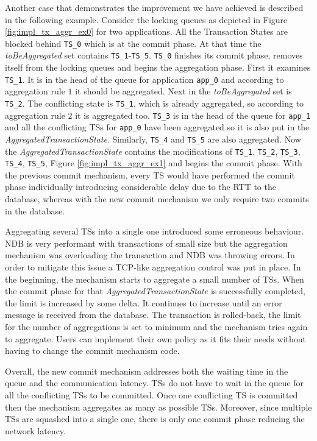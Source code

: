 Another case that demonstrates the improvement we have achieved is
described in the following example. Consider the locking queues as
depicted in Figure \ref{fig:impl_tx_aggr_ex0} for two applications. All the Transaction
States are blocked behind \texttt{TS\_0} which is at the commit
phase. At that time the \emph{toBeAggregated} set contains
\texttt{TS\_1}-\texttt{TS\_5}. \texttt{TS\_0} finishes its commit phase, removes
itself from the locking queues and begins the aggregation phase. First
it examines \texttt{TS\_1}. It is in the head of the queue for
application \texttt{app\_0} and according to aggregation rule $1$ it
should be aggregated. Next in the \emph{toBeAggregated} set is
\texttt{TS\_2}. The conflicting state is \texttt{TS\_1}, which is
already aggregated, so according to aggregation rule $2$ it is
aggregated too. \texttt{TS\_3} is in the head of the queue for
\texttt{app\_1} and all the conflicting TSs for \texttt{app\_0} have
been aggregated so it is also put in the
\emph{AggregatedTransactionState}. Similarly, \texttt{TS\_4} and
\texttt{TS\_5} are also aggregated. Now the
\emph{AggregatedTransactionState} contains the modifications of
\texttt{TS\_1}, \texttt{TS\_2}, \texttt{TS\_3}, \texttt{TS\_4},
\texttt{TS\_5}, Figure \ref{fig:impl_tx_aggr_ex1} and begins the commit phase. With the previous commit
mechanism, every TS would have performed the commit phase individually introducing
considerable delay due to the RTT to the database, whereas with the
new commit mechanism we only require two commits in the database.

Aggregating several TSs into a single one introduced some erroneous
behaviour. NDB is very performant with transactions of small size but
the aggregation mechanism was overloading the transaction and NDB was
throwing errors. In order to mitigate this issue a TCP-like aggregation control
was put in place. In the beginning, the mechanism starts to aggregate
a small number of TSs. When the commit phase for that
\emph{AggregatedTransactionState} is successfully completed, the limit
is increased by some delta. It continues to increase until an error
message is received from the database. The transaction is rolled-back,
the limit for the number of aggregations is set to minimum and the
mechanism tries again to aggregate. Users can implement their own
policy as it fits their needs without having to change the commit
mechanism code.

Overall, the new commit mechanism addresses both the waiting time in
the queue and the communication latency. TSs do not have to wait in
the queue for all the conflicting TSs to be committed. Once one
conflicting TS is committed then the mechanism aggregates as many as
possible TSs. Moreover, since multiple TSs are squashed into a single
one, there is only one commit phase reducing the network latency.
